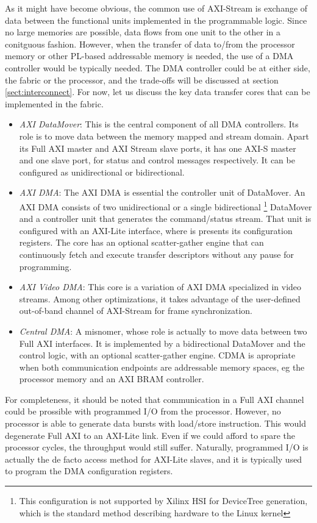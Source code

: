 As it might have become obvious, the common use of AXI-Stream is exchange of data between the
functional units implemented in the programmable logic. Since no large memories are possible,
data flows from one unit to the other in a conitguous fashion. However, when the transfer of data
to/from the processor memory or other PL-based addressable memory is needed, the use of a DMA
controller would be typically needed. The DMA controller could be at either side, 
the fabric or the processor, and the trade-offs will be discussed at section \ref{sect:interconnect}.
For now, let us discuss the key data transfer cores that can be implemented in the fabric.
\begin{itemize}

\item	\emph{AXI DataMover}: This is the central component of all DMA controllers.
	Its role is to move data between the memory mapped and stream domain.
	Apart its Full AXI master and AXI Stream slave ports, 
	it has one AXI-S master and one slave port, 
	for status and control messages respectively.
	It can be configured as unidirectional or bidirectional.
\item	\emph{AXI DMA}: The AXI DMA is essential the controller unit of DataMover. 
	An AXI DMA consists of two unidirectional or a single bidirectional
	\footnote{This configuration is not supported by Xilinx HSI for DeviceTree generation,
	which is the standard method describing hardware to the Linux kernel}
	DataMover and a controller unit that generates the command/status stream.
	That unit is configured with an AXI-Lite interface, where is presents its configuration registers.
	The core has an optional scatter-gather engine that can continuously fetch and execute
	transfer descriptors without any pause for programming.
\item	\emph{AXI Video DMA}: This core is a variation of AXI DMA specialized in video streams.
	Among other optimizations, it takes advantage of the user-defined out-of-band channel
	of AXI-Stream for frame synchronization.
\item	\emph{Central DMA}: A misnomer, whose role is actually to move data between two Full AXI interfaces.
	It is implemented by a bidirectional DataMover and the control logic, with an optional
	scatter-gather engine. CDMA is apropriate when both communication endpoints are addressable
	memory spaces, eg the processor memory and an AXI BRAM controller.
\end{itemize}

For completeness, it should be noted that communication in a Full AXI channel could be prossible
with programmed I/O from the processor. However, no processor is able to generate data bursts
with load/store instruction. This would degenerate Full AXI to an AXI-Lite link. 
Even if we could afford to spare the processor cycles, the throughput would still suffer.
Naturally, programmed I/O is actually the de facto access method for AXI-Lite slaves,
and it is typically used to program the DMA configuration registers.


